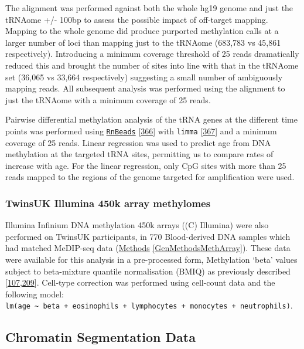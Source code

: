 \documentclass[
]{book}
\begin{document}
The alignment was performed against both the whole hg19 genome and just the tRNAome +/- 100bp to assess the possible impact of off-target mapping.
Mapping to the whole genome did produce purported methylation calls at a larger number of loci than mapping just to the tRNAome (683,783 vs 45,861 respectively).
Introducing a minimum coverage threshold of 25 reads dramatically reduced this and brought the number of sites into line with that in the tRNAome set (36,065 vs 33,664 respectively) suggesting a small number of ambiguously mapping reads.
All subsequent analysis was performed using the alignment to just the tRNAome with a minimum coverage of 25 reads.

Pairwise differential methylation analysis of the tRNA genes at the different time points was performed using \href{https://bioconductor.org/packages/release/bioc/html/RnBeads.html}{\texttt{RnBeads}} {[}\protect\hyperlink{ref-Muller2019}{366}{]} with \texttt{limma} {[}\protect\hyperlink{ref-Ritchie2015}{367}{]} and a minimum coverage of 25 reads.
Linear regression was used to predict age from DNA methylation at the targeted tRNA sites, permitting us to compare rates of increase with age.
For the linear regression, only CpG sites with more than 25 reads mapped to the regions of the genome targeted for amplification were used.

\hypertarget{twinsuk-illumina-450k-array-methylomes}{%
\subsubsection{TwinsUK Illumina 450k array methylomes}\label{twinsuk-illumina-450k-array-methylomes}}

Illumina Infinium DNA methylation 450k arrays ((C) Illumina) were also performed on TwinsUK participants, in 770 Blood-derived DNA samples which had matched MeDIP-seq data (\protect\hyperlink{GenMethodsMethArray}{Methods} \ref{GenMethodsMethArray}).
These data were available for this analysis in a pre-processed form, Methylation `beta' values subject to beta-mixture quantile normalisation (BMIQ) as previously described {[}\protect\hyperlink{ref-Bell2017a}{107},\protect\hyperlink{ref-Bell2016}{209}{]}.
Cell-type correction was performed using cell-count data and the following model: \texttt{lm(age\ \textasciitilde{}\ beta\ +\ eosinophils\ +\ lymphocytes\ +\ monocytes\ +\ neutrophils)}.

\hypertarget{chromatin-segmentation-data}{%
\subsection{Chromatin Segmentation Data}\label{chromatin-segmentation-data}}
\end{document}
